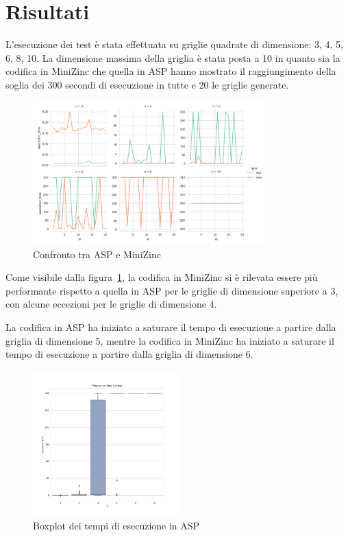 \section{Risultati}\label{sec:risultati}
L'esecuzione dei test è stata effettuata su griglie quadrate di dimensione: 3, 4, 5, 6, 8, 10.
La dimensione massima della griglia è stata posta a 10 in quanto sia la codifica in MiniZinc che quella in ASP hanno mostrato il raggiungimento della soglia dei 300 secondi di esecuzione in tutte e 20 le griglie generate.

\begin{figure}
    \centering
    \includegraphics[width=0.8\textwidth]{img/cmpplot}
    \caption{Confronto tra ASP e MiniZinc}
    \label{fig:cmpplot}
\end{figure}

Come visibile dalla figura~\ref{fig:cmpplot}, la codifica in MiniZinc si è rilevata essere più performante rispetto a quella in ASP per le griglie di dimensione superiore a 3, con alcune eccezioni per le griglie di dimensione 4.

La codifica in ASP ha iniziato a saturare il tempo di esecuzione a partire dalla griglia di dimensione 5, mentre la codifica in MiniZinc ha iniziato a saturare il tempo di esecuzione a partire dalla griglia di dimensione 6.

\begin{figure}
    \centering
    \includegraphics[width=0.5\textwidth]{img/boxplot_asp}
    \caption{Boxplot dei tempi di esecuzione in ASP}
    \label{fig:boxplot_asp}
\end{figure}

